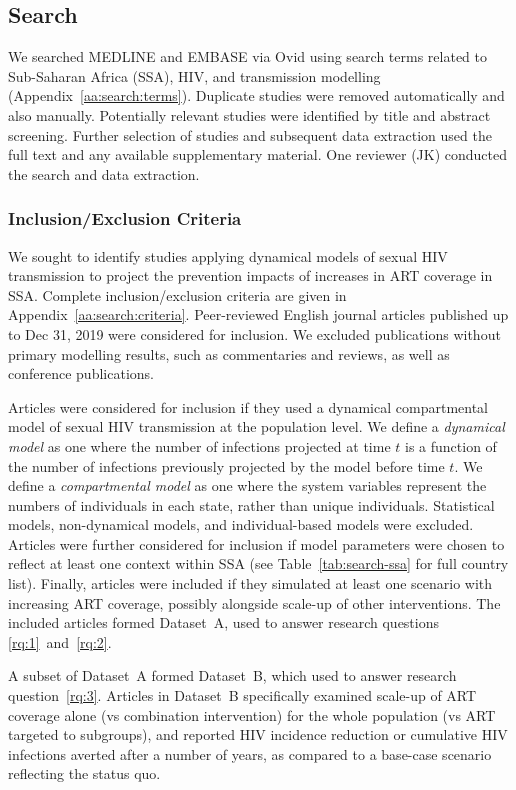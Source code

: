 \subsection{Search}
\label{ss:meth:search}
We searched MEDLINE and EMBASE via Ovid
using search terms related to Sub-Saharan Africa (SSA), HIV, and transmission modelling
(Appendix~\ref{aa:search:terms}).
Duplicate studies were removed automatically and also manually.
Potentially relevant studies were identified by title and abstract screening.
Further selection of studies and subsequent data extraction used
the full text and any available supplementary material.
One reviewer (JK) conducted the search and data extraction.
\subsubsection{Inclusion/Exclusion Criteria}
\label{sss:meth:criteria}
We sought to identify studies applying dynamical models of sexual HIV transmission
to project the prevention impacts of increases in ART coverage in SSA.
Complete inclusion/exclusion criteria are given in
Appendix~\ref{aa:search:criteria}.
Peer-reviewed English journal articles published up to Dec 31, 2019
were considered for inclusion.
We excluded publications without primary modelling results,
such as commentaries and reviews, as well as conference publications.
\par
Articles were considered for inclusion if they used a dynamical compartmental model of
sexual HIV transmission at the population level.
We define a \emph{dynamical model} as one where
the number of infections projected at time $t$ is a function of
the number of infections previously projected by the model before time $t$.
We define a \emph{compartmental model} as one where
the system variables represent the numbers of individuals in each state,
rather than unique individuals.
Statistical models, non-dynamical models, and individual-based models were excluded.
Articles were further considered for inclusion if model parameters
were chosen to reflect at least one context within SSA
(see Table~\ref{tab:search-ssa} for full country list).
Finally, articles were included if they
simulated at least one scenario with increasing ART coverage,
possibly alongside scale-up of other interventions.
The included articles formed Dataset~A,
used to answer research questions \ref{rq:1}~and~\ref{rq:2}.
\par
A subset of Dataset~A formed Dataset~B,
which used to answer research question~\ref{rq:3}.
Articles in Dataset~B specifically examined
scale-up of ART coverage alone (vs combination intervention)
for the whole population (vs ART targeted to subgroups),
and reported HIV incidence reduction or cumulative HIV infections averted
after a number of years, as compared to a base-case scenario reflecting the status quo.
